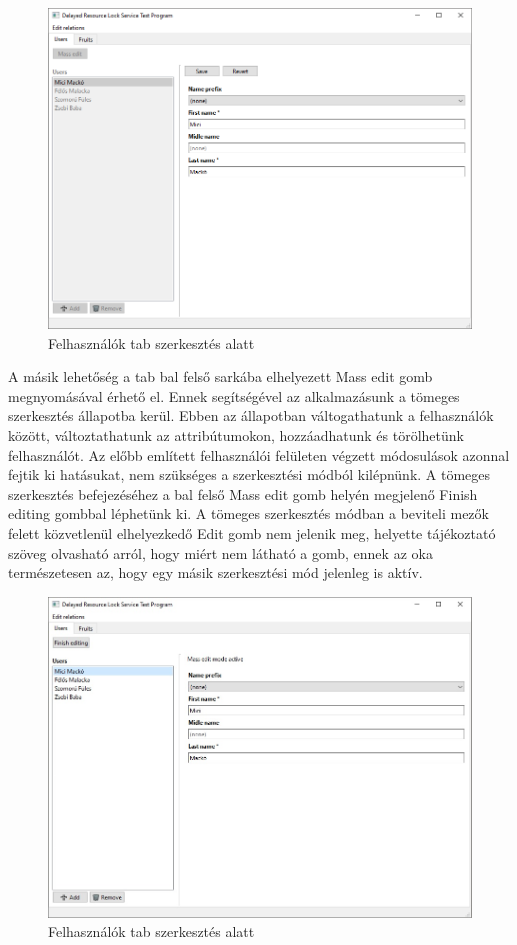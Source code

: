 \begin{figure}[H]
	\centering
	\includegraphics[width=1\textwidth]{images/UsersTabEdit.png}
	\caption{Felhasználók tab szerkesztés alatt}
	\label{fig:main_window}
\end{figure}

A másik lehetőség a tab bal felső sarkába elhelyezett Mass edit gomb megnyomásával érhető el. Ennek segítségével az alkalmazásunk a tömeges szerkesztés állapotba kerül. Ebben az állapotban váltogathatunk a felhasználók között, változtathatunk az attribútumokon, hozzáadhatunk és törölhetünk felhasználót. Az előbb említett felhasználói felületen végzett módosulások azonnal fejtik ki hatásukat, nem szükséges a szerkesztési módból kilépnünk. A tömeges szerkesztés befejezéséhez a bal felső Mass edit gomb helyén megjelenő Finish editing gombbal léphetünk ki. A tömeges szerkesztés módban a beviteli mezők felett közvetlenül elhelyezkedő Edit gomb nem jelenik meg, helyette tájékoztató szöveg olvasható arról, hogy miért nem látható a gomb, ennek az oka természetesen az, hogy egy másik szerkesztési mód jelenleg is aktív.

\begin{figure}[H]
	\centering
	\includegraphics[width=1\textwidth]{images/UsersTabMassEdit.png}
	\caption{Felhasználók tab szerkesztés alatt}
	\label{fig:main_window}
\end{figure}

